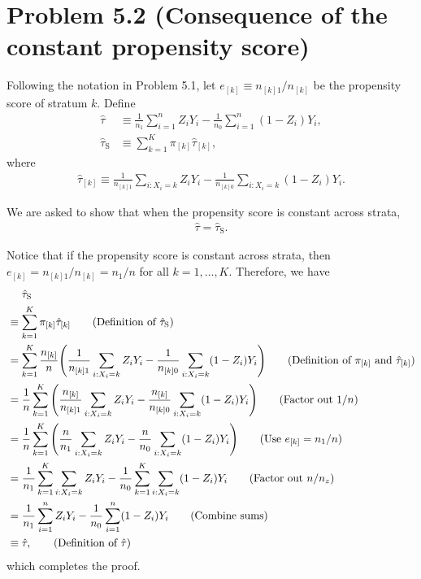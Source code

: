 \documentclass[10pt]{article}
\begin{document}
\section*{Problem 5.2 (Consequence of the constant propensity score)}

Following the notation in Problem 5.1,
let $e_{[k]} \equiv n_{[k]1}/n_{[k]}$ be the propensity score of stratum $k$.
Define 
\begin{align*}
  \hat{\tau} &\equiv \frac{1}{n_1} \sum_{i=1}^n Z_i Y_i - \frac{1}{n_0} \sum_{i=1}^n (1 - Z_i) Y_i, \\
  \hat{\tau}_{\text{S}} &\equiv \sum_{k=1}^K \pi_{[k]} \hat{\tau}_{[k]},
\end{align*}
where 
\begin{align*}
  \hat{\tau}_{[k]} 
  \equiv \frac{1}{n_{[k]1}} \sum_{i:X_i = k} Z_i Y_i 
  - \frac{1}{n_{[k]0}} \sum_{i:X_i = k} (1 - Z_i) Y_i.
\end{align*}

We are asked to show that when the propensity score is constant across strata,
\begin{align}
  \hat{\tau} = \hat{\tau}_{\text{S}}. \tag{5.3}
\end{align}

Notice that if the propensity score is constant across strata,
then $e_{[k]} = n_{[k]1}/n_{[k]} = n_1/n$ for all $k = 1, \ldots, K$.
Therefore, we have
\begin{align*}
  &\mathrel{\phantom{=}} \hat{\tau}_{\text{S}} \\
  &\equiv \sum_{k=1}^K \pi_{[k]} \hat{\tau}_{[k]} \tag{Definition of $\hat{\tau}_{\text{S}}$} \\
  &= \sum_{k=1}^K \frac{n_{[k]}}{n} \bp{\frac{1}{n_{[k]1}} \sum_{i:X_i = k} Z_i Y_i - \frac{1}{n_{[k]0}} \sum_{i:X_i = k} (1 - Z_i) Y_i} 
    \tag{Definition of $\pi_{[k]}$ and $\hat{\tau}_{[k]}$} \\
  &= \frac{1}{n} \sum_{k=1}^K \bp{\frac{n_{[k]}}{n_{[k]1}} \sum_{i:X_i = k} Z_i Y_i - \frac{n_{[k]}}{n_{[k]0}} \sum_{i:X_i = k} (1 - Z_i) Y_i} \tag{Factor out $1/n$} \\
  &= \frac{1}{n} \sum_{k=1}^K \bp{ \frac{n}{n_1} \sum_{i:X_i = k} Z_i Y_i - \frac{n}{n_0} \sum_{i:X_i = k} (1 - Z_i) Y_i} 
    \tag{Use $e_{[k]} = n_1/n$} \\
  &= \frac{1}{n_1} \sum_{k=1}^K \sum_{i:X_i = k} Z_i Y_i - \frac{1}{n_0} \sum_{k=1}^K \sum_{i:X_i = k} (1 - Z_i) Y_i \tag{Factor out $n/n_z$} \\
  &= \frac{1}{n_1} \sum_{i=1}^n Z_i Y_i - \frac{1}{n_0} \sum_{i=1}^n (1 - Z_i) Y_i \tag{Combine sums} \\
  &\equiv \hat{\tau}, \tag{Definition of $\hat{\tau}$}
\end{align*}
which completes the proof.
\end{document}

